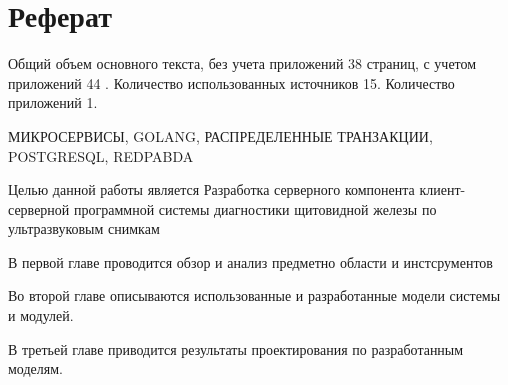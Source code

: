 \chapter*{Реферат}
\thispagestyle{plain}

Общий объем основного текста, без учета приложений 38
\pageref{end_of_main_text} страниц, с учетом приложений 44
\pageref{end_of_document}. Количество использованных источников 15.
Количество приложений 1.

\noindent \uppercase{микросервисы, golang, распределенные транзакции, postgresql, redpabda}

Целью данной работы является Разработка серверного компонента клиент-серверной
программной системы диагностики щитовидной железы по
ультразвуковым снимкам

В первой главе проводится обзор и анализ предметно области и инстсрументов

Во второй главе описываются использованные и разработанные модели системы и модулей. 

В третьей главе приводится результаты проектирования по разработанным моделям.

